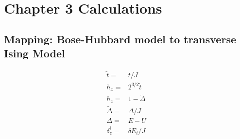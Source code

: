 %
%


\chapter{Chapter 3 Calculations}
\label{appendix:Ch3Cal}

\newpage{}

\section{Mapping: Bose-Hubbard model to transverse Ising Model}

\begin{eqnarray}
\tilde{t} = & t/J \\
h_x =  & 2^{3/2}\tilde{t} \\
h_z = & 1-\tilde{\Delta} \\
\tilde{\Delta} = & \Delta/J \\ 
\Delta = &  E-U \\
\delta_z^i =  & \delta E_i /J
\end{eqnarray}


%
%
